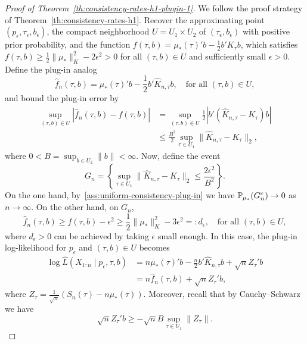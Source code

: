 \begin{proof}[Proof of Theorem~\ref{th:consistency-rates-h1-plugin-1}]\label{proof:consistency-rates-h1-plugin-1}
We follow the proof strategy of Theorem~\ref{th:consistency-rates-h1}. Recover the approximating point \((p_\epsilon,\tau_\epsilon,b_\epsilon)\), the compact neighborhood \(U=U_1\times U_2\) of \((\tau_\epsilon, b_\epsilon)\) with positive prior probability, and the function \(f(\tau, b)=\mu_*(\tau)'b - \frac{1}{2}b'K_\tau b\), which satisfies \(f(\tau, b)\geq \frac{1}{2}\|\mu_*\|_K^2 - 2\epsilon^2 >0\) for all \((\tau,b)\in U\) and sufficiently small \(\epsilon>0\). Define the plug-in analog
\[
\hat f_n(\tau,b) = \mu_*(\tau)'b - \frac{1}{2}b'\hat K_{n,\tau} b,\quad \text{for all } (\tau,b)\in U,
\]
and bound the plug-in error by
\begin{align*}
\sup_{(\tau,b)\in U}|\hat f_n(\tau,b) - f(\tau,b)| &= \sup_{(\tau,b)\in U}\frac{1}{2}|b'(\hat K_{n,\tau}-K_\tau)b| \\
&\leq \frac{B^2}{2}\sup_{\tau\in U_1}\|\hat K_{n,\tau}-K_\tau\|_2,
\end{align*}
where \(0<B=\sup_{b\in U_2} \|b\|<\infty\). Now, define the event 
\[
G_n = \left\{\sup_{\tau\in U_1}\|\hat K_{n,\tau} - K_\tau\|_2 \leq \frac{2\epsilon^2}{B^2}\right\}.
\]
On the one hand, by~\ref{ass:uniform-consistency-plug-in} we have \(\mathbb{P}_{\mu_*}(G_n^c)\to 0\) as \(n\to\infty\). On the other hand, on \(G_n\),
\begin{equation}\label{eq:plugin-f-lower-bound}
\hat f_n(\tau,b) \geq f(\tau,b) - \epsilon^2 \geq \frac{1}{2}\|\mu_*\|_K^2 - 3\epsilon^2 =: d_\epsilon, \quad \text{for all } (\tau,b)\in U,
\end{equation}
where \(d_\epsilon>0\) can be achieved by taking \(\epsilon\) small enough. In this case, the plug-in log-likelihood for \(p_\epsilon\) and \((\tau, b)\in U\) becomes
\begin{equation}\label{eq:log-likelihood-plugin}
  \begin{split}
  \log \hat L(X_{1:n}\mid p_\epsilon, \tau, b) &= n\mu_*(\tau)'b - \frac{n}{2}b'\hat K_{n,\tau}b + \sqrt{n}Z_\tau' b \\
  &= n\hat f_n(\tau, b) + \sqrt{n}Z_\tau' b,
  \end{split}
\end{equation}
where \(Z_\tau = \frac{1}{\sqrt{n}}(S_n(\tau) - n\mu_*(\tau))\). Moreover, recall that by Cauchy--Schwarz we have
\begin{equation}\label{eq:cauchy-schwarz-plugin}
\sqrt{n} Z_\tau' b \geq -\sqrt{n} B \sup_{\tau \in U_1}\|Z_\tau\|.
\end{equation}


\end{proof}
